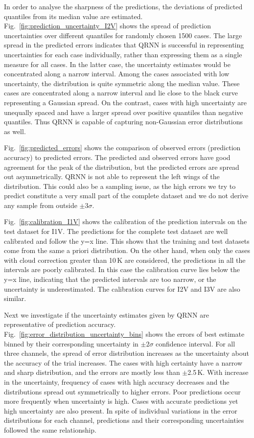 \documentclass[amt, manuscript]{copernicus}
\begin{document}
In order to analyse the sharpness of the predictions, the deviations of predicted quantiles from its median value are estimated. Fig.~\ref{fig:prediction_uncertainty_I2V} shows the spread of prediction uncertainties over different quantiles for randomly chosen 1500 cases. The large spread in the predicted errors indicates that QRNN is successful in representing uncertainties for each case individually, rather than expressing them as a single measure for all cases. In the latter case, the uncertainty estimates would be concentrated along a narrow interval. Among the cases associated with low uncertainty, the distribution is quite symmetric along the median value. These cases are concentrated along a narrow interval and lie close to the black curve representing a Gaussian spread. On the contrast, cases with high uncertainty are unequally spaced and have a larger spread over positive quantiles than negative quantiles. Thus QRNN is capable of capturing non-Gaussian error distributions as well. 

Fig.~\ref{fig:predicted_errors} shows the comparison of observed errors (prediction accuracy) to predicted errors. The predicted and observed errors have good agreement for the peak of the distribution, but the predicted errors are spread out asymmetrically. QRNN is not able to represent the left wings of the distribution. This could also be a sampling issue, as the high errors we try to predict constitute a very small part of the complete dataset and we do not derive any sample from outside $\pm3\sigma$.   

Fig.~\ref{fig:calibration_I1V} shows the calibration of the prediction intervals on the test dataset for I1V. The predictions for the complete test dataset are well calibrated and follow the y=x line. This shows that the training and test datasets come from the same a priori distribution. On the other hand, when only the cases with  cloud correction greater than 10\,K are considered, the predictions in all the intervals are poorly calibrated. In this case the calibration curve lies below the y=x line, indicating that the predicted intervals are too narrow, or the uncertainty is underestimated. The calibration curves for I2V and I3V are also similar. 

Next we investigate if the uncertainty estimates given by QRNN are representative of prediction accuracy. Fig.~\ref{fig:error_distribution_uncertainty_bins} shows the errors of best estimate binned by their corresponding uncertainty in $\pm2\sigma$  confidence interval. For all three channels, the spread of error distribution increases as the uncertainty about the accuracy of the trial increases. The cases with high certainty have a narrow and sharp distribution, and the errors are mostly less than $\pm$2.5\,K. With increase in the uncertainty, frequency of cases with high accuracy decreases and the distributions spread out symmetrically to higher errors. Poor predictions occur more frequently when uncertainty is high. Cases with accurate predictions yet high uncertainty are also present. In spite of individual variations in the error distributions for each channel, predictions and their corresponding uncertainties followed the same relationship.
\end{document}
